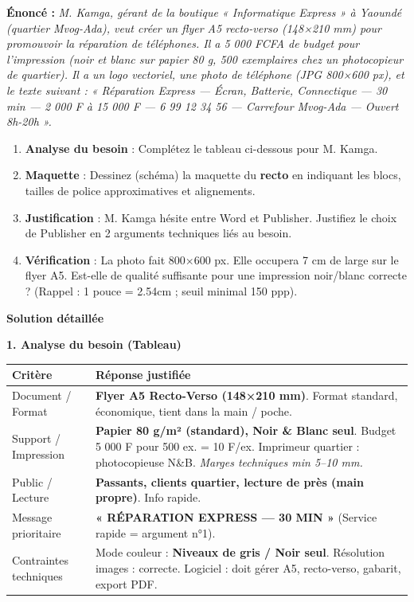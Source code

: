 \documentclass[11pt]{article}
\begin{document}
\begin{exoresolu}
\textbf{Énoncé :} \textit{M. Kamga, gérant de la boutique « \textit{Informatique Express »} à Yaoundé (quartier Mvog-Ada), veut créer un flyer A5 recto-verso (148×210 mm) pour promouvoir la réparation de téléphones. Il a 5 000 FCFA de budget pour l'impression (noir et blanc sur papier 80 g, 500 exemplaires chez un photocopieur de quartier). Il a un logo vectoriel, une photo de téléphone (JPG 800×600 px), et le texte suivant : « Réparation Express — Écran, Batterie, Connectique — 30 min — 2 000 F à 15 000 F — 6 99 12 34 56 — Carrefour Mvog-Ada — Ouvert 8h-20h ».}

\begin{enumerate}
    \item \textbf{Analyse du besoin} : Complétez le tableau ci-dessous pour M. Kamga.
    \item \textbf{Maquette} : Dessinez (schéma) la maquette du \textbf{recto} en indiquant les blocs, tailles de police approximatives et alignements.
    \item \textbf{Justification} : M. Kamga hésite entre Word et Publisher. Justifiez le choix de Publisher en 2 arguments techniques liés au besoin.
    \item \textbf{Vérification} : La photo fait 800×600 px. Elle occupera 7 cm de large sur le flyer A5. Est-elle de qualité suffisante pour une impression noir/blanc correcte ? (Rappel : 1 pouce = 2.54cm ; seuil minimal 150 ppp).
\end{enumerate}

\tcblower
\textbf{Solution détaillée}

\textbf{1. Analyse du besoin (Tableau)}

\begin{center}
\begin{tabularx}{\linewidth}{|l|X|}
\hline
\textbf{Critère} & \textbf{Réponse justifiée} \\
\hline
Document / Format & \textbf{Flyer A5 Recto-Verso (148×210 mm)}. Format standard, économique, tient dans la main / poche. \\
\hline
Support / Impression & \textbf{Papier 80 g/m² (standard), Noir \& Blanc seul}. Budget 5 000 F pour 500 ex. = 10 F/ex. Imprimeur quartier : photocopieuse N\&B. \textit{Marges techniques min 5--10 mm.} \\
\hline
Public / Lecture & \textbf{Passants, clients quartier, lecture de près (main propre)}. Info rapide. \\
\hline
Message prioritaire & \textbf{« RÉPARATION EXPRESS — 30 MIN »} (Service rapide = argument n°1). \\
\hline
Contraintes techniques & Mode couleur : \textbf{Niveaux de gris / Noir seul}. Résolution images : correcte. Logiciel : doit gérer A5, recto-verso, gabarit, export PDF. \\
\hline
\end{tabularx}
\end{center}


\end{exoresolu}
\end{document}
